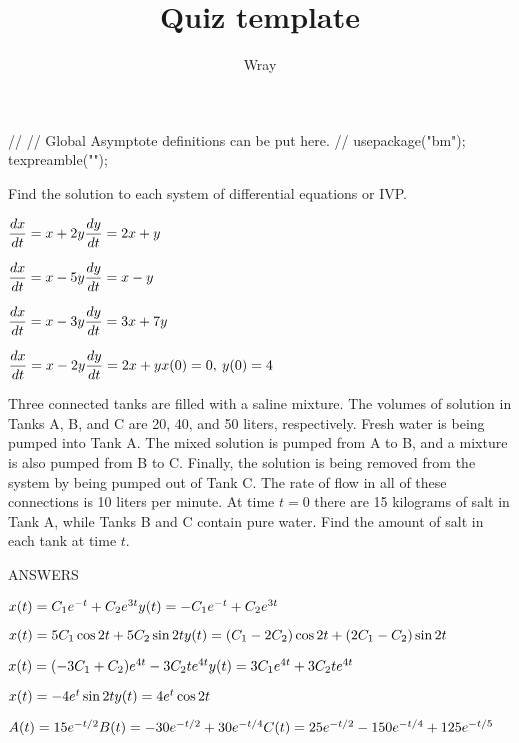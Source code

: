 \documentclass[addpoints, 12pt]{exam}
\title{Quiz template}
\author{Wray}
\begin{document}
\begin{asydef}
//
// Global Asymptote definitions can be put here.
//
usepackage("bm");
texpreamble("\def\V#1{\bm{#1}}");
\end{asydef}



\bigskip
\bigskip
\newline
Find the solution to each system of differential equations or IVP.
\begin{questions}

\question
$\dfrac{dx}{dt} = x + 2y \smallskip \\ \dfrac{dy}{dt} = 2x + y$

\question
$\dfrac{dx}{dt} = x - 5y \smallskip \\ \dfrac{dy}{dt} = x - y$

\question
$\dfrac{dx}{dt} = x - 3y \smallskip \\ \dfrac{dy}{dt} = 3x + 7y$

\question
$\dfrac{dx}{dt} = x - 2y \smallskip \\ \dfrac{dy}{dt} = 2x + y \smallskip \\ x(0) = 0, \> y(0) = 4$

\question
Three connected tanks are filled with a saline mixture.  The volumes of solution in Tanks A, B, and C are 20, 40, and 50 liters, respectively.  Fresh water is being pumped into Tank A.  The mixed solution is pumped from A to B, and a mixture is also pumped from B to C.  Finally, the solution is being removed from the system by being pumped out of Tank C.  The rate of flow in all of these connections is 10 liters per minute.  At time $t = 0$ there are 15 kilograms of salt in Tank A, while Tanks B and C contain pure water.  Find the amount of salt in each tank at time $t$.
\end{questions}

\newpage

ANSWERS

\begin{questions}

\question
$x(t) = C_1e^{-t} + C_2 e^{3t} \\
y(t) = -C_1e^{-t} + C_2 e^{3t}$

\question
$x(t) = 5C_1 \cos 2t + 5C_2 \sin 2t \\
y(t) = (C_1 - 2C_2) \cos 2t + (2C_1 - C_2) \sin 2t$

\question
$x(t) = (-3C_1 + C_2) e^{4t} - 3C_2 te^{4t} \\
y(t) = 3C_1e^{4t} + 3C_2 te^{4t}$

\question
$x(t) = -4e^t \sin 2t \\
y(t) = 4e^t \cos 2t$

\question
$A(t) = 15e^{-t/2} \\ B(t) = -30e^{-t/2} + 30e^{-t/4} \\
C(t) = 25e^{-t/2} - 150e^{-t/4} + 125e^{-t/5}$

\end{questions}
\end{document}
